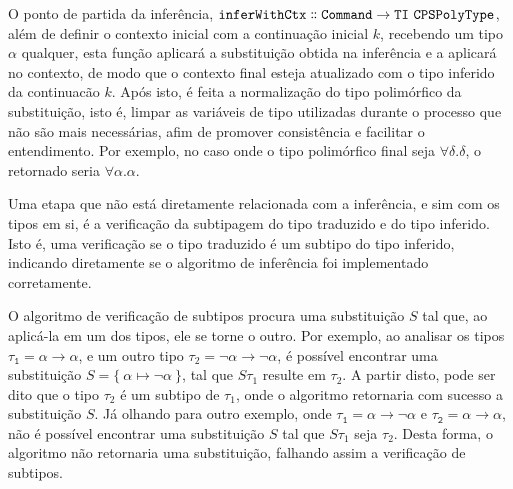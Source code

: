 O ponto de partida da inferência, $\mathtt{inferWithCtx \dblcolon Command \to TI\ CPSPolyType}$, além de definir o contexto inicial com a continuação inicial $k$, recebendo um tipo $\alpha$ qualquer, esta função aplicará a substituição obtida na inferência e a aplicará no contexto, de modo que o contexto final esteja atualizado com o tipo inferido da continuacão $k$.
Após isto, é feita a normalização do tipo polimórfico da substituição, isto é, limpar as variáveis de tipo utilizadas durante o processo que não são mais necessárias, afim de promover consistência e facilitar o entendimento.
Por exemplo, no caso onde o tipo polimórfico final seja $\forall\delta.\delta$, o retornado seria $\forall\alpha.\alpha$.

Uma etapa que não está diretamente relacionada com a inferência, e sim com os tipos em si, é a verificação da subtipagem do tipo traduzido e do tipo inferido.
Isto é, uma verificação se o tipo traduzido é um subtipo do tipo inferido, indicando diretamente se o algoritmo de inferência foi implementado corretamente.

O algoritmo de verificação de subtipos procura uma substituição $S$ tal que, ao aplicá-la em um dos tipos, ele se torne o outro.
Por exemplo, ao analisar os tipos $\mathtt{\tau_1 = \alpha \to \alpha}$, e um outro tipo $\tau_2 = \neg\alpha \to \neg\alpha$, é possível encontrar uma substituição $S = \{\ \alpha \mapsto \neg\alpha \ \}$, tal que $S\tau_1$ resulte em $\tau_2$.
A partir disto, pode ser dito que o tipo $\tau_2$ é um subtipo de $\tau_1$, onde o algoritmo retornaria com sucesso a substituição $S$.
Já olhando para outro exemplo, onde $\mathtt{\tau_1 = \alpha \to \neg\alpha}$ e $\mathtt{\tau_2 = \alpha \to \alpha}$, não é possível encontrar uma substituição $S$ tal que $S\tau_1$ seja $\tau_2$.
Desta forma, o algoritmo não retornaria uma substituição, falhando assim a verificação de subtipos.
